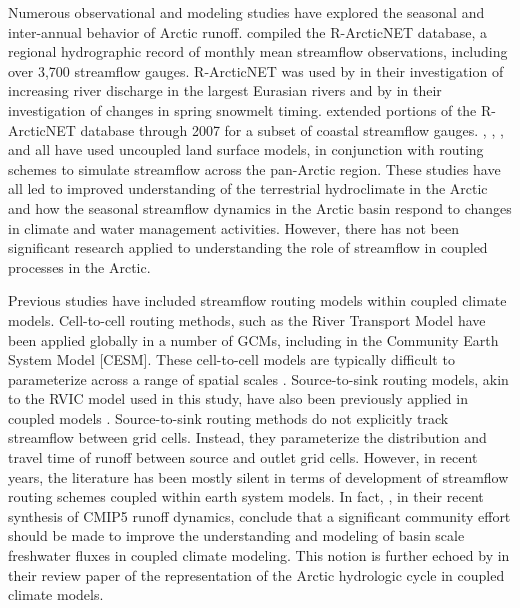 \documentclass[jgrga, draft]{agutex}
\begin{document}
\begin{article}
Numerous observational and modeling studies have explored the seasonal and inter-annual behavior of Arctic runoff.
\citet{Lammers_2001} compiled the R-ArcticNET database, a regional hydrographic record of monthly mean streamflow observations, including over 3,700 streamflow gauges.
R-ArcticNET was used by \citet{Shiklomanov_2009} in their investigation of increasing river discharge in the largest Eurasian rivers and by \citet{Tan_2011} in their investigation of changes in spring snowmelt timing.
\citet{Dai_2009} extended portions of the R-ArcticNET database through 2007 for a subset of coastal streamflow gauges.
\citet{Adam_2007}, \citet{Adam_2008}, \citet{Su_2005}, and \citet{Dai_2009} all have used uncoupled land surface models, in conjunction with routing schemes to simulate streamflow across the pan-Arctic region.
These studies have all led to improved understanding of the terrestrial hydroclimate in the Arctic and how the seasonal streamflow dynamics in the Arctic basin respond to changes in climate and water management activities.
However, there has not been significant research applied to understanding the role of streamflow in coupled processes in the Arctic.

Previous studies have included streamflow routing models within coupled climate models.
Cell-to-cell routing methods, such as the River Transport Model \citep[RTM][]{Branstetter_2003} have been applied globally in a number of GCMs, including in the Community Earth System Model [CESM].
These cell-to-cell models are typically difficult to parameterize across a range of spatial scales \citep{Sushama_2004}.
Source-to-sink routing models, akin to the RVIC model used in this study, have also been previously applied in coupled models \citep[e.g.][]{Olivera_2000}.
Source-to-sink routing methods do not explicitly track streamflow between grid cells. Instead, they parameterize the distribution and travel time of runoff between source and outlet grid cells.
However, in recent years, the literature has been mostly silent in terms of development of streamflow routing schemes coupled within earth system models.
In fact, \citet{Bring_2015}, in their recent synthesis of CMIP5 runoff dynamics, conclude that a significant community effort should be made to improve the understanding and modeling of basin scale freshwater fluxes in coupled climate modeling.
This notion is further echoed by \citet{Lique_2015} in their review paper of the representation of the Arctic hydrologic cycle in coupled climate models.


\end{article}
\end{document}
